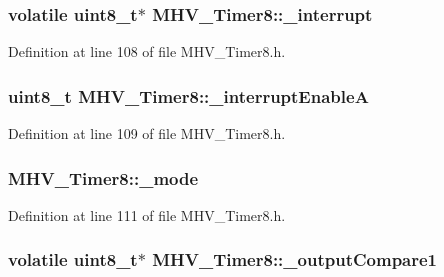\hypertarget{class_m_h_v___timer8_a98e41d7d3ceef4b8fce11644ea110ee9}{
\subsubsection[{\-\_\-interrupt}]{\setlength{\rightskip}{0pt plus 5cm}volatile uint8\-\_\-t$\ast$ {\bf \-M\-H\-V\-\_\-\-Timer8\-::\-\_\-interrupt}}}
\label{class_m_h_v___timer8_a98e41d7d3ceef4b8fce11644ea110ee9}


\-Definition at line 108 of file \-M\-H\-V\-\_\-\-Timer8.\-h.

\hypertarget{class_m_h_v___timer8_ad2fac7586dc6104b1c7323c84ba88559}{
\subsubsection[{\-\_\-interrupt\-Enable\-A}]{\setlength{\rightskip}{0pt plus 5cm}uint8\-\_\-t {\bf \-M\-H\-V\-\_\-\-Timer8\-::\-\_\-interrupt\-Enable\-A}}}
\label{class_m_h_v___timer8_ad2fac7586dc6104b1c7323c84ba88559}


\-Definition at line 109 of file \-M\-H\-V\-\_\-\-Timer8.\-h.

\hypertarget{class_m_h_v___timer8_a6f6b063d32d0778e8d1a91c561c79f13}{
\subsubsection[{\-\_\-mode}]{ {\bf \-M\-H\-V\-\_\-\-Timer8\-::\-\_\-mode}}}
\label{class_m_h_v___timer8_a6f6b063d32d0778e8d1a91c561c79f13}


\-Definition at line 111 of file \-M\-H\-V\-\_\-\-Timer8.\-h.

\hypertarget{class_m_h_v___timer8_ab69320fb8fee00da797099aa633fdd92}{
\subsubsection[{\-\_\-output\-Compare1}]{\setlength{\rightskip}{0pt plus 5cm}volatile uint8\-\_\-t$\ast$ {\bf \-M\-H\-V\-\_\-\-Timer8\-::\-\_\-output\-Compare1}}}
\label{class_m_h_v___timer8_ab69320fb8fee00da797099aa633fdd92}


